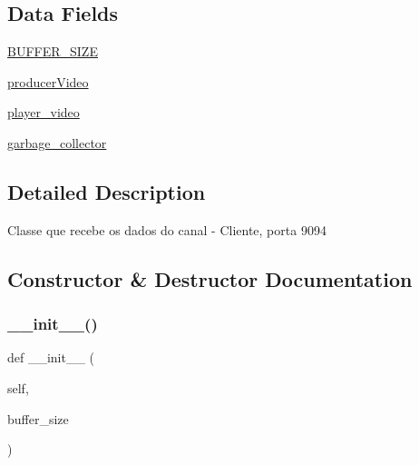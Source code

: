 \subsection*{Data Fields}
\begin{DoxyCompactItemize}
\item 
\hyperlink{class_client_1_1_client_receptor_aa300d171bb6f6573a2de65c5342303c9}{B\+U\+F\+F\+E\+R\+\_\+\+S\+I\+ZE}
\item 
\hyperlink{class_client_1_1_client_receptor_a8f5ab768a38f5129d304bd00bd90d1b7}{producer\+Video}
\item 
\hyperlink{class_client_1_1_client_receptor_a265f7032febb91142eb6d7d9859eceb6}{player\+\_\+video}
\item 
\hyperlink{class_client_1_1_client_receptor_aa04cdc077d3e69c463bc713ce77f79ff}{garbage\+\_\+collector}
\end{DoxyCompactItemize}


\subsection{Detailed Description}
\begin{DoxyVerb}Classe que recebe os dados do canal - Cliente, porta 9094\end{DoxyVerb}
 

\subsection{Constructor \& Destructor Documentation}
\mbox{\label{class_client_1_1_client_receptor_a8e9700e92cd4deb19f86ea6dc2f98cd3}} 
\subsubsection{\texorpdfstring{\+\_\+\+\_\+init\+\_\+\+\_\+()}{\_\_init\_\_()}}
{\footnotesize\ttfamily def \+\_\+\+\_\+init\+\_\+\+\_\+ (\begin{DoxyParamCaption}\item[{}]{self,  }\item[{}]{buffer\+\_\+size }\end{DoxyParamCaption})}



